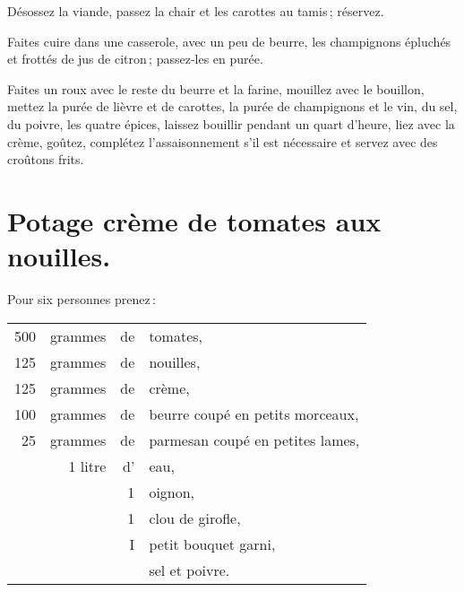Désossez la viande, passez la chair et les carottes au tamis ; réservez.

Faites cuire dans une casserole, avec un peu de beurre, les champignons
épluchés et frottés de jus de citron ; passez-les en purée.

Faites un roux avec le reste du beurre et la farine, mouillez avec le bouillon,
mettez la purée de lièvre et de carottes, la purée de champignons et le vin, du
sel, du poivre, les quatre épices, laissez bouillir pendant un quart d'heure,
liez avec la crème, goûtez, complétez l’assaisonnement s'il est nécessaire et
servez avec des croûtons frits.

\section*{\centering Potage crème de tomates aux nouilles.}

Pour six personnes prenez :

\medskip

\footnotesize
\begin{longtable}{rrrp{16em}}                                                    
    500 & grammes   & de & tomates,                                                                       \\
    125 & grammes   & de & nouilles,                                                                      \\
    125 & grammes   & de & crème,                                                                         \\
    100 & grammes   & de & beurre coupé en petits morceaux,                                               \\
     25 & grammes   & de & parmesan coupé en petites lames,                                               \\
        & 1 litre   & d' & eau,                                                                           \\
        &           &  1 & oignon,                                                                        \\
        &           &  1 & clou de girofle,                                                               \\
        &           &  I & petit bouquet garni,                                                           \\
        &           &    & sel et poivre.                                                                 \\
\end{longtable}
\normalsize                                                                                         

